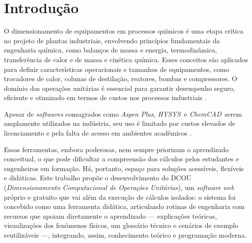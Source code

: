 \chapter{Introdução}

O dimensionamento de equipamentos em processos químicos é uma etapa crítica no projeto de plantas industriais, envolvendo princípios fundamentais da engenharia química, como balanços de massa e energia, termodinâmica, transferência de calor e de massa e cinética química. Esses conceitos são aplicados para definir características operacionais e tamanhos de equipamentos, como trocadores de calor, colunas de destilação, reatores, bombas e compressores. O domínio das operações unitárias é essencial para garantir desempenho seguro, eficiente e otimizado em termos de custos nos processos industriais \cite{felder2005}.

Apesar de \textit{softwares} consagrados como \textit{Aspen Plus}\textregistered, \textit{HYSYS}\textregistered\ e \textit{ChemCAD}\textregistered\ serem amplamente utilizados na indústria, seu uso é limitado por custos elevados de licenciamento e pela falta de acesso em ambientes acadêmicos \cite{aspen2025,aspenhysys2026,chemcad2026,alves2022}.

Essas ferramentas, embora poderosas, nem sempre priorizam o aprendizado conceitual, o que pode dificultar a compreensão dos cálculos pelos estudantes e engenheiros em formação. Há, portanto, espaço para soluções acessíveis, flexíveis e didáticas. Este trabalho propõe o desenvolvimento do DCOU (\textit{Dimensionamento Computacional de Operações Unitárias}), um \textit{software} \textit{web} próprio e gratuito que vai além da execução de cálculos isolados: o sistema foi concebido como uma ferramenta didática, articulando rotinas de engenharia com recursos que apoiam diretamente o aprendizado --- explicações teóricas, visualizações dos fenômenos físicos, um glossário técnico e cenários de exemplo reutilizáveis ---, integrando, assim, conhecimento teórico e programação moderna.
